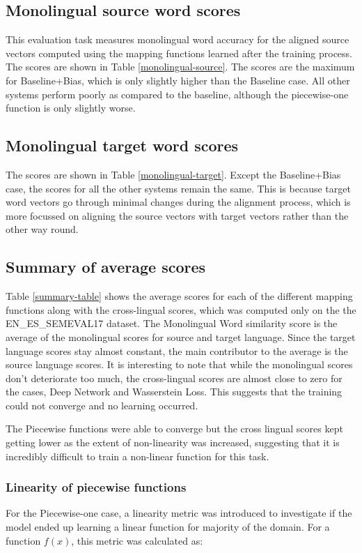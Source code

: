 \documentclass[11pt]{article}
\begin{document}
\subsection{Monolingual source word scores}
This evaluation task measures monolingual word accuracy for the aligned source vectors computed using the mapping functions learned after the training process. The scores are shown in Table \ref{monolingual-source}. The scores are the maximum for Baseline+Bias, which is only slightly higher than the Baseline case. All other systems perform poorly as compared to the baseline, although the piecewise-one function is only slightly worse.

\subsection{Monolingual target word scores}
The scores are shown in Table \ref{monolingual-target}. Except the Baseline+Bias case, the scores for all the other systems remain the same. This is because target word vectors go through minimal changes during the alignment process, which is more focussed on aligning the source vectors with target vectors rather than the other way round.

\subsection{Summary of average scores}
Table \ref{summary-table} shows the average scores for each of the different mapping functions along with the cross-lingual scores, which was computed only on the the EN\_ES\_SEMEVAL17 dataset. The Monolingual Word similarity score is the average of the monolingual scores for source and target language. Since the target language scores stay almost constant, the main contributor to the average is the source language scores. It is interesting to note that while the monolingual scores don't deteriorate too much, the cross-lingual scores are almost close to zero for the cases, Deep Network and Wasserstein Loss. This suggests that the training could not converge and no learning occurred.

The Piecewise functions were able to converge but the cross lingual scores kept getting lower as the extent of non-linearity was increased, suggesting that it is incredibly difficult to train a non-linear function for this task.

\subsubsection{Linearity of piecewise functions} \label{linearity}
For the Piecewise-one case, a linearity metric was introduced to investigate if the model ended up learning a linear function for majority of the domain. For a function $f(x)$, this metric was calculated as:
\end{document}
